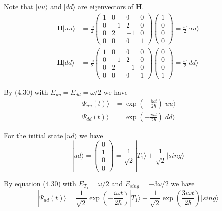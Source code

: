 Note that $|uu\rangle$ and $|dd\rangle$ are eigenvectors of $\mathbf H$.
\begin{align*}
\mathbf H|uu\rangle&=\frac{\omega}{2}
\begin{pmatrix}
1&0&0&0
\\
0&-1&2&0
\\
0&2&-1&0
\\
0&0&0&1
\end{pmatrix}
\begin{pmatrix}1\\0\\0\\0\end{pmatrix}
=\frac{\omega}{2}|uu\rangle
\\[1ex]
\mathbf H|dd\rangle&=\frac{\omega}{2}
\begin{pmatrix}
1&0&0&0
\\
0&-1&2&0
\\
0&2&-1&0
\\
0&0&0&1
\end{pmatrix}
\begin{pmatrix}0\\0\\0\\1\end{pmatrix}
=\frac{\omega}{2}|dd\rangle
\end{align*}

By (4.30) with $E_{uu}=E_{dd}=\omega/2$ we have
\begin{align*}
|\Psi_{uu}(t)\rangle&=\exp\left(-\frac{i\omega t}{2\hbar}\right)|uu\rangle
\\
|\Psi_{dd}(t)\rangle&=\exp\left(-\frac{i\omega t}{2\hbar}\right)|dd\rangle
\end{align*}

For the initial state $|ud\rangle$ we have
\begin{equation*}
|ud\rangle=\begin{pmatrix}0\\1\\0\\0\end{pmatrix}
=\frac{1}{\sqrt2}|T_1\rangle+\frac{1}{\sqrt2}|sing\rangle
\end{equation*}

By equation (4.30) with $E_{T_1}=\omega/2$ and $E_{sing}=-3\omega/2$ we have
\begin{equation*}
|\Psi_{ud}(t)\rangle
=\frac{1}{\sqrt2}\exp\left(-\frac{i\omega t}{2\hbar}\right)|T_1\rangle
+\frac{1}{\sqrt2}\exp\left(\frac{3i\omega t}{2\hbar}\right)|sing\rangle
\end{equation*}

